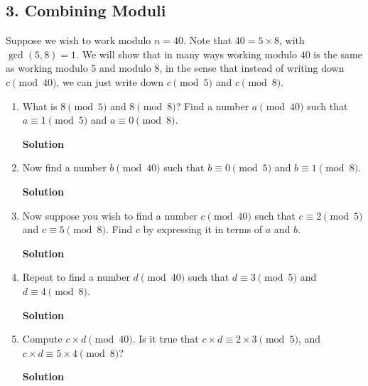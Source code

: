 \documentclass{article}\usepackage{amsmath,amssymb,amsthm,tikz,tkz-graph,color,chngpage,soul,hyperref,csquotes,graphicx,floatrow}\newcommand*{\QEDB}{\hfill\ensuremath{\square}}\newtheorem*{prop}{Proposition}\renewcommand{\theenumi}{\alph{enumi}}\usepackage[shortlabels]{enumitem}\usepackage[nobreak=true]{mdframed}\usetikzlibrary{matrix,calc}\MakeOuterQuote{"}\usepackage[margin=0.75in]{geometry}
\begin{document}
\subsection*{3. Combining Moduli}
Suppose we wish to work modulo $n=40$. Note that $40=5\times 8$, with $\gcd(5,8)=1$. We will show that in many ways working modulo $40$ is the same as working modulo $5$ and modulo $8$, in the sense that instead of writing down $c\pmod {40}$, we can just write down $c\pmod 5$ and $c\pmod 8$.
\begin{enumerate}
\item What is $8\pmod 5$ and $8\pmod 8$? Find a number $a\pmod {40}$ such that $a\equiv 1\pmod 5$ and $a\equiv 0\pmod 8$.
\begin{mdframed}
\textbf{Solution}

\end{mdframed}
\item Now find a number $b\pmod {40}$ such that $b\equiv 0\pmod 5$ and $b\equiv 1\pmod 8$.
\begin{mdframed}
\textbf{Solution}

\end{mdframed}
\item Now suppose you wish to find a number $c\pmod {40}$ such that $c\equiv 2\pmod 5$ and $c\equiv 5\pmod 8$. Find $c$ by expressing it in terms of $a$ and $b$.
\begin{mdframed}
\textbf{Solution}

\end{mdframed}
\item Repeat to find a number $d\pmod {40}$ such that $d\equiv 3\pmod 5$ and $d\equiv 4\pmod 8$.
\begin{mdframed}
\textbf{Solution}

\end{mdframed}
\item Compute $c\times d\pmod {40}$. Is it true that $c\times d\equiv 2\times 3\pmod 5$, and $c\times d\equiv 5\times 4\pmod 8$?
\begin{mdframed}
\textbf{Solution}

\end{mdframed}
\end{enumerate}
\clearpage

\end{document}
